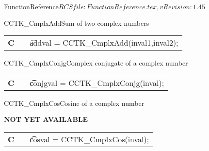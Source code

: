 \begin{cactuspart}{5}{FunctionReference}{$RCSfile: FunctionReference.tex,v $}{$Revision: 1.45 $}
\begin{CCTKFunc}{CCTK\_CmplxAdd}{Sum of two complex numbers}
\label{CCTK-CmplxAdd}
\showcargs
\begin{params}
\end{params}
\begin{discussion}
\end{discussion}
\begin{examples}
\begin{tabular}{@{}p{3cm}cp{11cm}}
\hfill {\bf C} && {\t addval = CCTK\_CmplxAdd(inval1,inval2)};
\end{tabular}
\end{examples}
\begin{errorcodes}
\end{errorcodes}
\end{CCTKFunc}

\begin{CCTKFunc}{CCTK\_CmplxConjg}{Complex conjugate of a complex number}
\label{CCTK-CmplxConjg}
\showcargs
\begin{params}
\end{params}
\begin{discussion}
\end{discussion}
\begin{examples}
\begin{tabular}{@{}p{3cm}cp{11cm}}
\hfill {\bf C} && {\t conjgval = CCTK\_CmplxConjg(inval)};
\end{tabular}
\end{examples}
\begin{errorcodes}
\end{errorcodes}
\end{CCTKFunc}

\begin{CCTKFunc}{CCTK\_CmplxCos}{Cosine of a complex number}
\label{CCTK-CmplxCos}
\showcargs
\begin{params}
\end{params}
\begin{discussion}
{\bf NOT YET AVAILABLE}
\end{discussion}
\begin{examples}
\begin{tabular}{@{}p{3cm}cp{11cm}}
\hfill {\bf C} && {\t cosval = CCTK\_CmplxCos(inval)};
\end{tabular}
\end{examples}
\begin{errorcodes}
\end{errorcodes}
\end{CCTKFunc}



\end{cactuspart}
